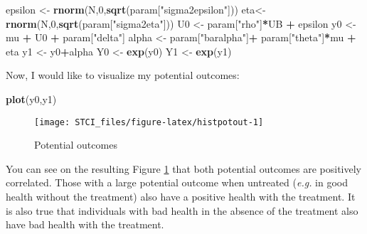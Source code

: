\documentclass[]{book}
\newenvironment{Shaded}{\begin{snugshade}}{\end{snugshade}}
\newcommand{\DecValTok}[1]{\textcolor[rgb]{0.00,0.00,0.81}{#1}}
\newcommand{\KeywordTok}[1]{\textcolor[rgb]{0.13,0.29,0.53}{\textbf{#1}}}
\newcommand{\NormalTok}[1]{#1}
\newcommand{\OperatorTok}[1]{\textcolor[rgb]{0.81,0.36,0.00}{\textbf{#1}}}
\newcommand{\StringTok}[1]{\textcolor[rgb]{0.31,0.60,0.02}{#1}}
\theoremstyle{definition}
\theoremstyle{definition}
\theoremstyle{definition}
\theoremstyle{remark}
\begin{document}
\begin{Shaded}
\begin{Highlighting}[]
\NormalTok{epsilon <-}\StringTok{ }\KeywordTok{rnorm}\NormalTok{(N,}\DecValTok{0}\NormalTok{,}\KeywordTok{sqrt}\NormalTok{(param[}\StringTok{"sigma2epsilon"}\NormalTok{]))}
\NormalTok{eta<-}\StringTok{ }\KeywordTok{rnorm}\NormalTok{(N,}\DecValTok{0}\NormalTok{,}\KeywordTok{sqrt}\NormalTok{(param[}\StringTok{"sigma2eta"}\NormalTok{]))}
\NormalTok{U0 <-}\StringTok{ }\NormalTok{param[}\StringTok{"rho"}\NormalTok{]}\OperatorTok{*}\NormalTok{UB }\OperatorTok{+}\StringTok{ }\NormalTok{epsilon}
\NormalTok{y0 <-}\StringTok{ }\NormalTok{mu }\OperatorTok{+}\StringTok{  }\NormalTok{U0 }\OperatorTok{+}\StringTok{ }\NormalTok{param[}\StringTok{"delta"}\NormalTok{]}
\NormalTok{alpha <-}\StringTok{ }\NormalTok{param[}\StringTok{"baralpha"}\NormalTok{]}\OperatorTok{+}\StringTok{  }\NormalTok{param[}\StringTok{"theta"}\NormalTok{]}\OperatorTok{*}\NormalTok{mu }\OperatorTok{+}\StringTok{ }\NormalTok{eta}
\NormalTok{y1 <-}\StringTok{ }\NormalTok{y0}\OperatorTok{+}\NormalTok{alpha}
\NormalTok{Y0 <-}\StringTok{ }\KeywordTok{exp}\NormalTok{(y0)}
\NormalTok{Y1 <-}\StringTok{ }\KeywordTok{exp}\NormalTok{(y1)}
\end{Highlighting}
\end{Shaded}

Now, I would like to visualize my potential outcomes:

\begin{Shaded}
\begin{Highlighting}[]
\KeywordTok{plot}\NormalTok{(y0,y1)}
\end{Highlighting}
\end{Shaded}

\begin{figure}

{\centering \texttt{[image: STCI\_files/figure-latex/histpotout-1]} 

}

\caption{Potential outcomes}\label{fig:histpotout}
\end{figure}

You can see on the resulting Figure \ref{fig:histpotout} that both potential outcomes are positively correlated.
Those with a large potential outcome when untreated (\emph{e.g.} in good health without the treatment) also have a positive health with the treatment.
It is also true that individuals with bad health in the absence of the treatment also have bad health with the treatment.
\end{document}
